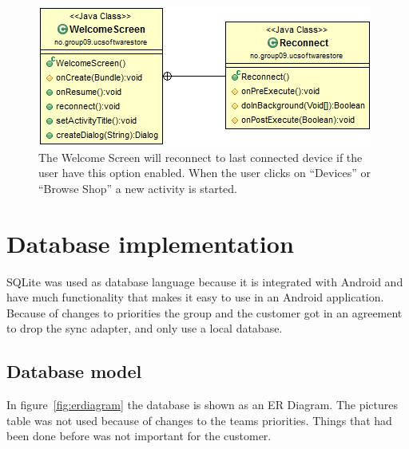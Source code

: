 	\begin{figure}[H]
	\centering
	\includegraphics[scale=0.85]{images/UML/welcomescreen.png}
	\caption[UML - Welcome Screen]{The Welcome Screen will reconnect to last connected device if the user have this option enabled. When the user clicks on ``Devices'' or ``Browse Shop'' a new activity is started.}
	\label{fig:welcomescreen}
	\end{figure}

\section{Database implementation}

	SQLite was used as database language because it is integrated with Android and have much functionality that makes it easy to use in an Android application. Because of changes to priorities the group and the customer got in an agreement to drop the sync adapter, and only use a local database.

	\subsection{Database model}

		In figure~\ref{fig:erdiagram} the database is shown as an ER Diagram. The pictures table was not used because of changes to the teams priorities. Things that had been done before was not important for the customer.

